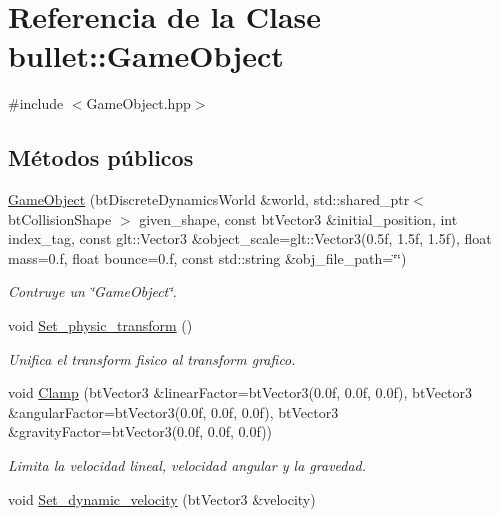 \hypertarget{classbullet_1_1_game_object}{}\section{Referencia de la Clase bullet\+::Game\+Object}
\label{classbullet_1_1_game_object}


{\ttfamily \#include $<$Game\+Object.\+hpp$>$}

\subsection*{Métodos públicos}
\begin{DoxyCompactItemize}
\item 
\mbox{\hyperlink{classbullet_1_1_game_object_a018c661eab06c5d1f1288d1c762231bb}{Game\+Object}} (bt\+Discrete\+Dynamics\+World \&world, std\+::shared\+\_\+ptr$<$ bt\+Collision\+Shape $>$ given\+\_\+shape, const bt\+Vector3 \&initial\+\_\+position, int index\+\_\+tag, const glt\+::\+Vector3 \&object\+\_\+scale=glt\+::\+Vector3(0.\+5f, 1.\+5f, 1.\+5f), float mass=0.\+f, float bounce=0.\+f, const std\+::string \&obj\+\_\+file\+\_\+path=\char`\"{}\char`\"{})
\begin{DoxyCompactList}\small\item\em Contruye un \char`\"{}\+Game\+Object\char`\"{}. \end{DoxyCompactList}\item 
void \mbox{\hyperlink{classbullet_1_1_game_object_a3380fbf972b0b85f52fde35d3e738b72}{Set\+\_\+physic\+\_\+transform}} ()
\begin{DoxyCompactList}\small\item\em Unifica el transform fisico al transform grafico. \end{DoxyCompactList}\item 
void \mbox{\hyperlink{classbullet_1_1_game_object_adee0a608c63fef6cfad7b9f5718e05cc}{Clamp}} (bt\+Vector3 \&linear\+Factor=bt\+Vector3(0.\+0f, 0.\+0f, 0.\+0f), bt\+Vector3 \&angular\+Factor=bt\+Vector3(0.\+0f, 0.\+0f, 0.\+0f), bt\+Vector3 \&gravity\+Factor=bt\+Vector3(0.\+0f, 0.\+0f, 0.\+0f))
\begin{DoxyCompactList}\small\item\em Limita la velocidad lineal, velocidad angular y la gravedad. \end{DoxyCompactList}\item 
void \mbox{\hyperlink{classbullet_1_1_game_object_a314ec56ebafc2f20bda02305c63b58e4}{Set\+\_\+dynamic\+\_\+velocity}} (bt\+Vector3 \&velocity)

\end{DoxyCompactItemize}
